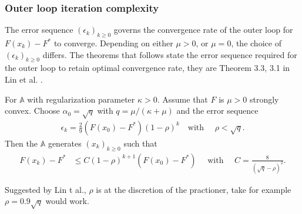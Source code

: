 \documentclass[12pt]{article}
\begin{document}
        \subsubsection{Outer loop iteration complexity}
            The error sequence $(\epsilon_k)_{k \ge 0}$ governs the convergence rate of the outer loop for $F(x_k) - F^*$ to converge. 
            Depending on either $\mu > 0$, or $\mu = 0$, the choice of $(\epsilon_k)_{k\ge 0}$ differs. 
            The theorems that follows state the error sequence required for the outer loop to retain optimal convergence rate, they are Theorem 3.3, 3.1 in Lin et al. \cite{lin_universal_2015}. 
            \begin{theorem}\label{thm:err-seq-outer-s-cnvx}
                For $\mathbb A$ with regularization parameter $\kappa > 0$. 
                Assume that $F$ is $\mu > 0$ strongly convex. 
                Choose $\alpha_0 = \sqrt{q}$ with $q = \mu/(\kappa + \mu)$ and the error sequence 
                $$
                \begin{aligned}
                    \epsilon_k = \frac{2}{9}(F(x_0) - F^*)(1 - \rho)^k \quad \text{with }\quad 
                    \rho < \sqrt{q}. 
                \end{aligned}
                $$
                Then the $\mathbb A$ generates $(x_{k})_{k \ge 0}$ such that 
                $$
                \begin{aligned}
                    F(x_k) - F^* &\le 
                    C(1 - \rho)^{k + 1} (F(x_0) - F^*) \quad \text{ with }\quad 
                    C = \frac{8}{(\sqrt{q} - \rho)^2}. 
                \end{aligned}
                $$
            \end{theorem}
            \begin{remark}
                Suggested by Lin t al., $\rho$ is at the discretion of the practioner, take for example $\rho = 0.9\sqrt{q}$ would work. 
            \end{remark}
\end{document}
